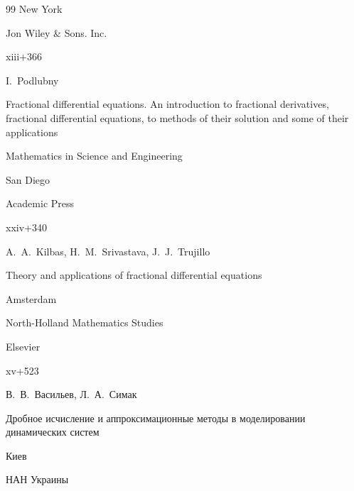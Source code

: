 \begin{thebibliography}{99}
\publaddr New York

\publ Jon Wiley \& Sons. Inc.


\totalpages  xiii+366











\by I.~Podlubny

\book Fractional differential equations. An introduction to fractional derivatives, fractional differential equations, to methods of their solution and some of their applications

\serial Mathematics in Science and Engineering


\publaddr  San Diego

\publ Academic Press


\totalpages xxiv+340 













\by A.~A.~Kilbas, H.~M.~Srivastava, J.~J.~Trujillo

\book Theory and applications of fractional differential equations

\publaddr Amsterdam

\serial North-Holland Mathematics Studies 


\publ Elsevier


\totalpages xv+523





\by В.~В.~Васильев, Л.~А.~Симак

\book Дробное исчисление и аппроксимационные методы в моделировании динамических систем

\publaddr Киев

\publ НАН Украины


\end{thebibliography}
